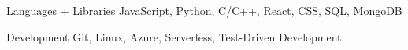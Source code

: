 
\begin{cvskills}
	\cvskill
		{Languages + Libraries}
		{JavaScript, Python, C/C++, React, CSS, SQL, MongoDB}

	\cvskill
		{Development}
		{Git, Linux, Azure, Serverless, Test-Driven Development}
\end{cvskills}